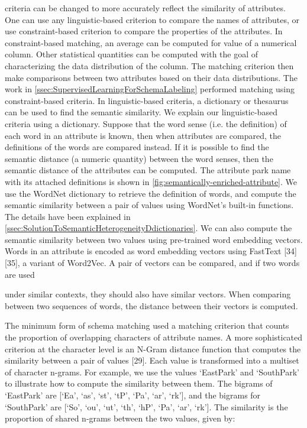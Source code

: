 criteria can be changed to more accurately reflect the similarity of attributes. One can use any linguistic-based criterion to compare the names of attributes, or use constraint-based criterion to compare the properties of the attributes. In constraint-based matching, an average can be computed for value of a numerical column. Other statistical quantities can be computed with the goal of characterizing the data distribution of the column. The matching criterion then make comparisons between two attributes based on their data distributions. The work in \autoref{ssec:SupervisedLearningForSchemaLabeling} performed matching using constraint-based criteria.
In linguistic-based criteria, a dictionary or thesaurus can be used to find the semantic similarity. We explain our linguistic-based criteria using a dictionary. Suppose that the word sense (i.e. the definition) of each word in an attribute is known, then when attributes are compared, the definitions of the words are compared instead. If it is possible to find the semantic distance (a numeric quantity) between the word senses, then the semantic distance of the attributes can be computed. The attribute park name with its attached definitions is shown in \autoref{fig:semantically-enriched-attribute}.
We use the WordNet dictionary to retrieve the definition of words, and compute the semantic similarity between a pair of values using WordNet's built-in functions. The details have been explained in \autoref{ssec:SolutionToSemanticHeterogeneityDdictionaries}.
We can also compute the semantic similarity between two values using pre-trained word embedding vectors. Words in an attribute is encoded as word embedding vectors using FastText \cite{Mudgal2018Deep}[34] \cite{Nargesian2018Table}[35], a variant of Word2Vec. A pair of vectors can be compared, and if two words are used

under similar contexts, they should also have similar vectors. When comparing between two sequences of words, the distance between their vectors is computed.

The minimum form of schema matching used a matching criterion that counts the proportion of overlapping characters of attribute names. A more sophisticated criterion at the character level is an N-Gram distance function that computes the similarity between a pair of values \cite{loper-bird-2002-nltk}[29]. Each value is transformed into a multiset of character n-grams. For example, we use the values `EastPark' and `SouthPark' to illustrate how to compute the similarity between them. The bigrams of `EastPark' are [`Ea', `as', `st', `tP', `Pa', `ar', `rk'], and the bigrams for `SouthPark' are [`So', `ou', `ut', `th', `hP', `Pa', `ar', `rk']. The similarity is the proportion of shared n-grams between the two values, given by:

